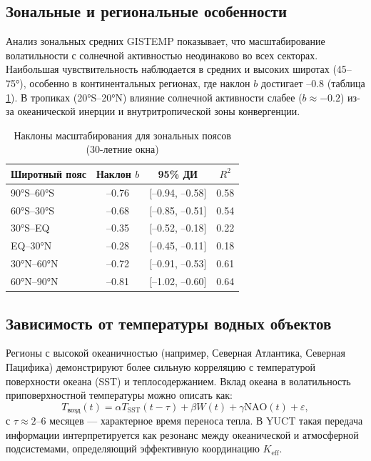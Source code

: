 \documentclass[12pt,a4paper]{article}
\newcommand{\Keff}{K_{\mathrm{eff}}}
\begin{document}
	\subsection{Зональные и региональные особенности}
	
	Анализ зональных средних GISTEMP показывает, что масштабирование волатильности с солнечной активностью неодинаково во всех секторах. Наибольшая чувствительность наблюдается в средних и высоких широтах (45–75°), особенно в континентальных регионах, где наклон \(b\) достигает –0.8 (таблица \ref{tab:zonal}). В тропиках (20°S–20°N) влияние солнечной активности слабее (\(b \approx -0.2\)) из-за океанической инерции и внутритропической зоны конвергенции.
	
	\begin{table}[htbp]
		\centering
		\caption{Наклоны масштабирования для зональных поясов (30-летние окна)}
		\label{tab:zonal}
		\begin{tabular}{@{}lccc@{}}
			\toprule
			Широтный пояс & Наклон \(b\) & 95\% ДИ & \(R^2\) \\
			\midrule
			90°S–60°S & –0.76 & [–0.94, –0.58] & 0.58 \\
			60°S–30°S & –0.68 & [–0.85, –0.51] & 0.54 \\
			30°S–EQ & –0.35 & [–0.52, –0.18] & 0.22 \\
			EQ–30°N & –0.28 & [–0.45, –0.11] & 0.18 \\
			30°N–60°N & –0.72 & [–0.91, –0.53] & 0.61 \\
			60°N–90°N & –0.81 & [–1.02, –0.60] & 0.64 \\
			\bottomrule
		\end{tabular}
	\end{table}
	
	\subsection{Зависимость от температуры водных объектов}
	
	Регионы с высокой океаничностью (например, Северная Атлантика, Северная Пацифика) демонстрируют более сильную корреляцию с температурой поверхности океана (SST) и теплосодержанием. Вклад океана в волатильность приповерхностной температуры можно описать как:
	\[
	T_{\text{возд}}(t) = \alpha T_{\text{SST}}(t-\tau) + \beta W(t) + \gamma \text{NAO}(t) + \varepsilon,
	\]
	с \(\tau \approx 2\)–6 месяцев — характерное время переноса тепла. В YUCT такая передача информации интерпретируется как резонанс между океанической и атмосферной подсистемами, определяющий эффективную координацию \(\Keff\).
	
\end{document}
